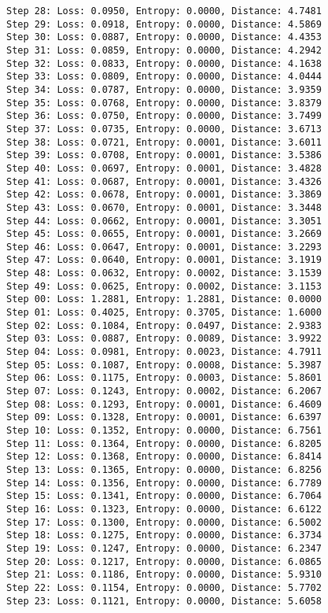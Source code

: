 \documentclass[11pt]{article}
\begin{document}
\begin{Verbatim}[commandchars=\\\{\}]
Step 28: Loss: 0.0950, Entropy: 0.0000, Distance: 4.7481
Step 29: Loss: 0.0918, Entropy: 0.0000, Distance: 4.5869
Step 30: Loss: 0.0887, Entropy: 0.0000, Distance: 4.4353
Step 31: Loss: 0.0859, Entropy: 0.0000, Distance: 4.2942
Step 32: Loss: 0.0833, Entropy: 0.0000, Distance: 4.1638
Step 33: Loss: 0.0809, Entropy: 0.0000, Distance: 4.0444
Step 34: Loss: 0.0787, Entropy: 0.0000, Distance: 3.9359
Step 35: Loss: 0.0768, Entropy: 0.0000, Distance: 3.8379
Step 36: Loss: 0.0750, Entropy: 0.0000, Distance: 3.7499
Step 37: Loss: 0.0735, Entropy: 0.0000, Distance: 3.6713
Step 38: Loss: 0.0721, Entropy: 0.0001, Distance: 3.6011
Step 39: Loss: 0.0708, Entropy: 0.0001, Distance: 3.5386
Step 40: Loss: 0.0697, Entropy: 0.0001, Distance: 3.4828
Step 41: Loss: 0.0687, Entropy: 0.0001, Distance: 3.4326
Step 42: Loss: 0.0678, Entropy: 0.0001, Distance: 3.3869
Step 43: Loss: 0.0670, Entropy: 0.0001, Distance: 3.3448
Step 44: Loss: 0.0662, Entropy: 0.0001, Distance: 3.3051
Step 45: Loss: 0.0655, Entropy: 0.0001, Distance: 3.2669
Step 46: Loss: 0.0647, Entropy: 0.0001, Distance: 3.2293
Step 47: Loss: 0.0640, Entropy: 0.0001, Distance: 3.1919
Step 48: Loss: 0.0632, Entropy: 0.0002, Distance: 3.1539
Step 49: Loss: 0.0625, Entropy: 0.0002, Distance: 3.1153
Step 00: Loss: 1.2881, Entropy: 1.2881, Distance: 0.0000
Step 01: Loss: 0.4025, Entropy: 0.3705, Distance: 1.6000
Step 02: Loss: 0.1084, Entropy: 0.0497, Distance: 2.9383
Step 03: Loss: 0.0887, Entropy: 0.0089, Distance: 3.9922
Step 04: Loss: 0.0981, Entropy: 0.0023, Distance: 4.7911
Step 05: Loss: 0.1087, Entropy: 0.0008, Distance: 5.3987
Step 06: Loss: 0.1175, Entropy: 0.0003, Distance: 5.8601
Step 07: Loss: 0.1243, Entropy: 0.0002, Distance: 6.2067
Step 08: Loss: 0.1293, Entropy: 0.0001, Distance: 6.4609
Step 09: Loss: 0.1328, Entropy: 0.0001, Distance: 6.6397
Step 10: Loss: 0.1352, Entropy: 0.0000, Distance: 6.7561
Step 11: Loss: 0.1364, Entropy: 0.0000, Distance: 6.8205
Step 12: Loss: 0.1368, Entropy: 0.0000, Distance: 6.8414
Step 13: Loss: 0.1365, Entropy: 0.0000, Distance: 6.8256
Step 14: Loss: 0.1356, Entropy: 0.0000, Distance: 6.7789
Step 15: Loss: 0.1341, Entropy: 0.0000, Distance: 6.7064
Step 16: Loss: 0.1323, Entropy: 0.0000, Distance: 6.6122
Step 17: Loss: 0.1300, Entropy: 0.0000, Distance: 6.5002
Step 18: Loss: 0.1275, Entropy: 0.0000, Distance: 6.3734
Step 19: Loss: 0.1247, Entropy: 0.0000, Distance: 6.2347
Step 20: Loss: 0.1217, Entropy: 0.0000, Distance: 6.0865
Step 21: Loss: 0.1186, Entropy: 0.0000, Distance: 5.9310
Step 22: Loss: 0.1154, Entropy: 0.0000, Distance: 5.7702
Step 23: Loss: 0.1121, Entropy: 0.0000, Distance: 5.6058

\end{Verbatim}
\end{document}
